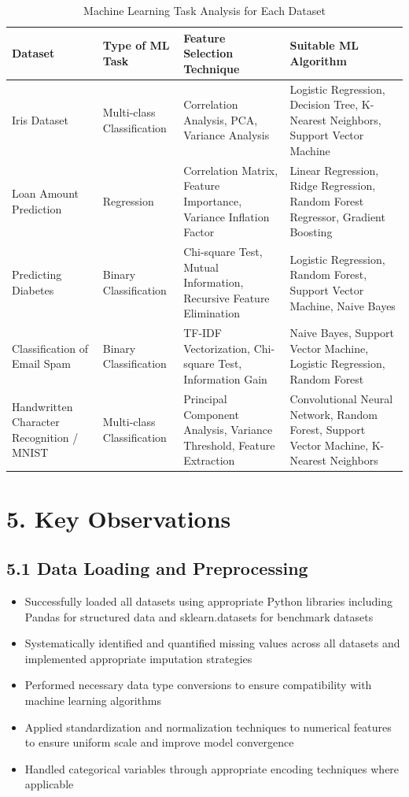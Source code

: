\documentclass[11pt]{article}
\begin{document}
\begin{table}[H]
\centering
\caption{Machine Learning Task Analysis for Each Dataset}
\begin{tabular}{|p{4cm}|p{3cm}|p{3.5cm}|p{3.5cm}|}
\hline
\textbf{Dataset} & \textbf{Type of ML Task} & \textbf{Feature Selection Technique} & \textbf{Suitable ML Algorithm} \\ \hline
Iris Dataset & Multi-class Classification & Correlation Analysis, PCA, Variance Analysis & Logistic Regression, Decision Tree, K-Nearest Neighbors, Support Vector Machine \\ \hline
Loan Amount Prediction & Regression & Correlation Matrix, Feature Importance, Variance Inflation Factor & Linear Regression, Ridge Regression, Random Forest Regressor, Gradient Boosting \\ \hline
Predicting Diabetes & Binary Classification & Chi-square Test, Mutual Information, Recursive Feature Elimination & Logistic Regression, Random Forest, Support Vector Machine, Naive Bayes \\ \hline
Classification of Email Spam & Binary Classification & TF-IDF Vectorization, Chi-square Test, Information Gain & Naive Bayes, Support Vector Machine, Logistic Regression, Random Forest \\ \hline
Handwritten Character Recognition / MNIST & Multi-class Classification & Principal Component Analysis, Variance Threshold, Feature Extraction & Convolutional Neural Network, Random Forest, Support Vector Machine, K-Nearest Neighbors \\ \hline
\end{tabular}
\end{table}


\section*{5. Key Observations}

\subsection*{5.1 Data Loading and Preprocessing}
\begin{itemize}
\item Successfully loaded all datasets using appropriate Python libraries including Pandas for structured data and sklearn.datasets for benchmark datasets
\item Systematically identified and quantified missing values across all datasets and implemented appropriate imputation strategies
\item Performed necessary data type conversions to ensure compatibility with machine learning algorithms
\item Applied standardization and normalization techniques to numerical features to ensure uniform scale and improve model convergence
\item Handled categorical variables through appropriate encoding techniques where applicable
\end{itemize}
\end{document}
